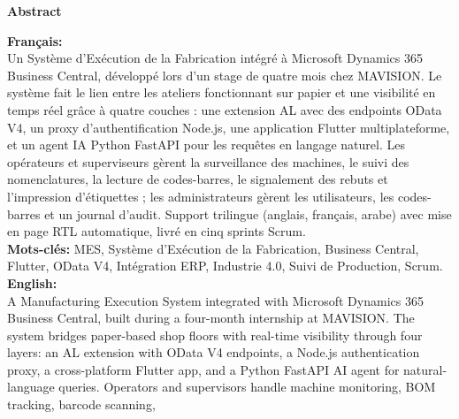 \documentclass[12pt,a4paper]{report}
\author{}
\date{}
\begin{document}
\dominitoc   %

\graphicspath{{./media/}}

\thispagestyle{empty}




\cleardoublepage
\thispagestyle{empty}
\begin{center}{\large\bfseries Abstract}\end{center}
\noindent\textbf{Français:} \\[2pt]
Un Système d'Exécution de la Fabrication intégré à Microsoft Dynamics 365 Business Central, 
développé lors d'un stage de quatre mois chez MAVISION. Le système fait le lien entre les ateliers
fonctionnant sur papier et une visibilité en temps réel grâce à quatre couches : une extension AL 
avec des endpoints OData V4, un proxy d'authentification Node.js, une application Flutter 
multiplateforme, et un agent IA Python FastAPI pour les requêtes en langage naturel. Les 
opérateurs et superviseurs gèrent la surveillance des machines, le suivi des nomenclatures, 
la lecture de codes-barres, le signalement des rebuts et l'impression d'étiquettes ; les 
administrateurs gèrent les utilisateurs, les codes-barres et un journal d'audit. Support 
trilingue (anglais, français, arabe) avec mise en page RTL automatique, livré en cinq sprints 
Scrum. \\[2pt]
\textbf{Mots-clés:} MES, Système d'Exécution de la Fabrication, Business Central, Flutter, OData V4,
Intégration ERP, Industrie 4.0, Suivi de Production, Scrum. \\[2pt]
\noindent\textbf{English:} \\[2pt]
A Manufacturing Execution System integrated with Microsoft Dynamics 365 Business Central, built 
during a four-month internship at MAVISION. The system bridges paper-based shop floors with 
real-time visibility through four layers: an AL extension with OData V4 endpoints, a Node.js 
authentication proxy, a cross-platform Flutter app, and a Python FastAPI AI agent for natural-language 
queries. Operators and supervisors handle machine monitoring, BOM tracking, barcode scanning, 
\end{document}
